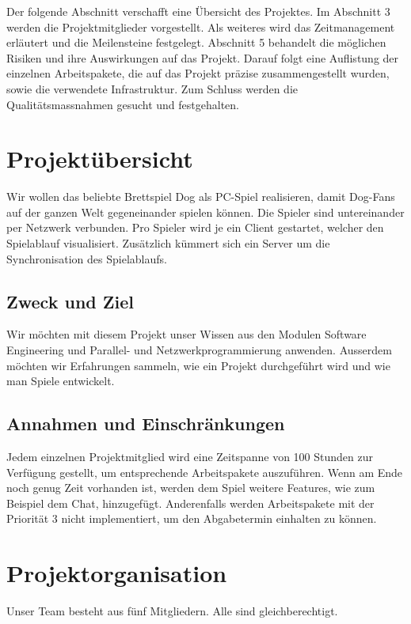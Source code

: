 \documentclass[a4paper,12pt,halfparskip,DIV14]{scrartcl}
\begin{document}
Der folgende Abschnitt verschafft eine Übersicht des Projektes. Im Abschnitt 3 werden die Projektmitglieder vorgestellt. Als weiteres wird das Zeitmanagement erläutert und die Meilensteine festgelegt. Abschnitt 5 behandelt die möglichen Risiken und ihre Auswirkungen auf das Projekt. Darauf folgt eine Auflistung der einzelnen Arbeitspakete, die auf das Projekt präzise zusammengestellt wurden, sowie die verwendete Infrastruktur. Zum Schluss werden die Qualitätsmassnahmen gesucht und festgehalten.


\section{Projektübersicht}

Wir wollen das beliebte Brettspiel Dog als PC-Spiel realisieren, damit Dog-Fans auf der ganzen Welt gegeneinander spielen können. Die Spieler sind untereinander per Netzwerk verbunden. Pro Spieler wird je ein Client gestartet, welcher den Spielablauf visualisiert. Zusätzlich kümmert sich ein Server um die Synchronisation des Spielablaufs.

\subsection{Zweck und Ziel}

Wir möchten mit diesem Projekt unser Wissen aus den Modulen Software Engineering und Parallel- und Netzwerkprogrammierung anwenden. Ausserdem möchten wir Erfahrungen sammeln, wie ein Projekt durchgeführt wird und wie man Spiele entwickelt.

\subsection{Annahmen und Einschränkungen}

Jedem einzelnen Projektmitglied wird eine Zeitspanne von 100 Stunden zur Verfügung gestellt, um entsprechende Arbeitspakete auszuführen. Wenn am Ende noch genug Zeit vorhanden ist, werden dem Spiel weitere Features, wie zum Beispiel dem Chat, hinzugefügt. Anderenfalls werden Arbeitspakete mit der Priorität 3 nicht implementiert, um den Abgabetermin einhalten zu können.


\section{Projektorganisation}

Unser Team besteht aus fünf Mitgliedern. Alle sind gleichberechtigt.
\end{document}
